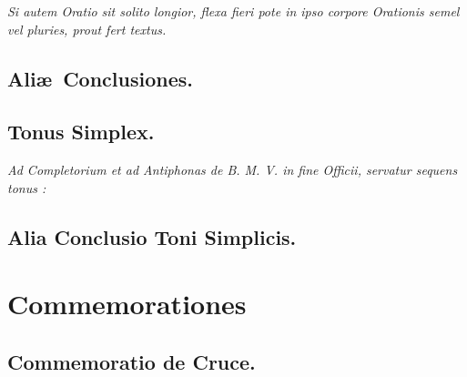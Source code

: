 \documentclass[12pt]{article} %
\newenvironment{rubric}{\vspace{1 mm}\color{benred8} \itshape \leftskip 0in \setlength{\parindent}{0.25in}}{\vspace{1 mm}}
\begin{document}

\vspace{1mm}

\begin{rubric}
Si autem Oratio sit solito longior, flexa fieri pote in ipso corpore Orationis semel vel pluries, prout fert textus.

\end{rubric}

\subsection*{Ali\ae\ Conclusiones.}


\vspace*{-1.0mm}

\subsection*{Tonus Simplex.}

\label{OratioSimplex}

\begin{rubric}
Ad Completorium et ad Antiphonas de B. M. V. in fine Officii, servatur sequens tonus :

\end{rubric}


\subsection*{Alia Conclusio Toni Simplicis.}


\newpage


\section*{Commemorationes}
\label{sec:Commem}

\thispagestyle{plain}


\subsection*{Commemoratio de Cruce.}
\end{document}
